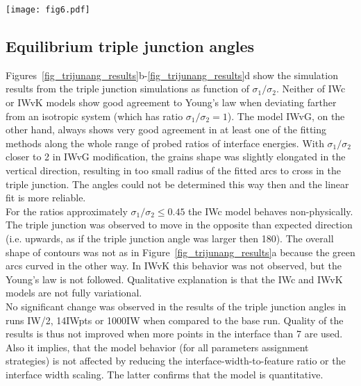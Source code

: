 \begin{figure*}[]
	\centering
	\texttt{[image: fig6.pdf]}
	\caption{Triple junction angles. In a) the two methods for angles determination are illustrated (points fitted by straight lines in red and those fitted by circular arc in green). Subfigures b)-d) show the simulation results for different models, these being: in b) IWc, in c) IWvG and in d) IWvK. The hollow symbols correspond to the the angles determined by arc fitting and crosses to the lines fitting.}
	\label{fig_trijunang_results}
\end{figure*}


\subsection{Equilibrium triple junction angles}
Figures~\ref{fig_trijunang_results}b-\ref{fig_trijunang_results}d show the simulation results from the triple junction simulations as function of $\sigma_1/\sigma_2$. Neither of IWc or IWvK models show good agreement to Young's law when deviating farther from an isotropic system (which has ratio $\sigma_1/\sigma_2=1$). The model IWvG, on the other hand, always shows very good agreement in at least one of the fitting methods along the whole range of probed ratios of interface energies. With $\sigma_1/\sigma_2$ closer to 2 in IWvG modification, the grains shape was slightly elongated in the vertical direction, resulting in too small radius of the fitted arcs to cross in the triple junction. The angles could not be determined this way then and the linear fit is more reliable. \\
For the ratios approximately $\sigma_1/\sigma_2\leq0.45$ the IWc model behaves non-physically. The triple junction was observed to move in the opposite than expected direction (i.e. upwards, as if the triple junction angle was larger then 180\textdegree). The overall shape of contours was not as in Figure~\ref{fig_trijunang_results}a because the green arcs curved in the other way. In IWvK this behavior was not observed, but the Young's law is not followed. Qualitative explanation is that the IWc and IWvK models are not fully variational. \\
No significant change was observed in the results of the triple junction angles in runs IW/2, 14IWpts or 1000IW when compared to the base run. Quality of the results is thus not improved when more points in the interface than 7 are used. Also it implies, that the model behavior (for all parameters assignment strategies) is not affected by reducing the interface-width-to-feature ratio or the interface width scaling. The latter confirms that the model is quantitative.


